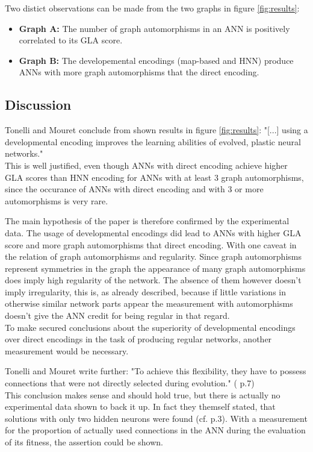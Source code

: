 \documentclass[12pt,twoside]{article}
\theoremstyle{plain}
\theoremstyle{definition}
\theoremstyle{remark}
\begin{document}
Two distict observations can be made from the two graphs in figure \ref{fig:results}:
\begin{itemize}
	\item \textbf{Graph A:} The number of graph automorphisms in an ANN is positively correlated to its GLA score. 
	\item \textbf{Graph B:} The developemental encodings (map-based and HNN) produce ANNs with more graph automorphisms that the direct encoding.
\end{itemize}

\subsection{Discussion}
Tonelli and Mouret conclude from shown results in figure \ref{fig:results}: "[...] using a developmental encoding improves the learning abilities of evolved, plastic neural networks."\\
This is well justified, even though ANNs with direct encoding achieve higher GLA scores than HNN encoding for ANNs with at least 3 graph automorphisms, since the occurance of ANNs with direct encoding and with 3 or more automorphisms is very rare.\medskip

The main hypothesis of the paper is therefore confirmed by the experimental data. The usage of developmental encodings did lead to ANNs with higher GLA score and more graph automorphisms that direct encoding. 
With one caveat in the relation of graph automorphisms and regularity. Since graph automorphisms represent symmetries in the graph the appearance of many graph automorphisms does imply high regularity of the network. The absence of them however doesn't imply irregularity, this is, as already described, because if little variations in otherwise similar network parts appear the measurement with automorphisms doesn't give the ANN credit for being regular in that regard.\\
To make secured conclusions about the superiority of developmental encodings over direct encodings in the task of producing regular networks, another measurement would be necessary. \medskip

Tonelli and Mouret write further: "To achieve this flexibility, they have to possess
connections that were not directly selected during evolution." (\cite{citeulike:12788284} p.7)\\
This conclusion makes sense and should hold true, but there is actually no experimental data shown to back it up. In fact they themself stated, that solutions with only two hidden neurons were found (cf. \cite{citeulike:12788284} p.3).
With a measurement for the proportion of actually used connections in the ANN during the evaluation of its fitness, the assertion could be shown.\medskip
\end{document}
